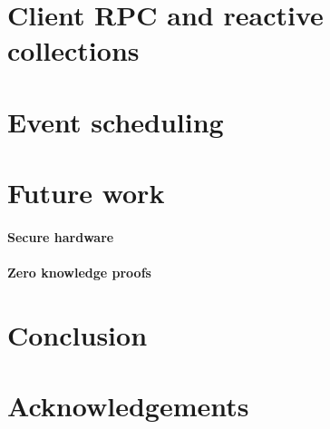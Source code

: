 \documentclass{article}
\begin{document}
\section{Client RPC and reactive collections}



\section{Event scheduling}\label{sec:event-scheduling}
\section{Future work}

\paragraph{Secure hardware}
\paragraph{Zero knowledge proofs}

\section{Conclusion}

\section{Acknowledgements}



\end{document}
